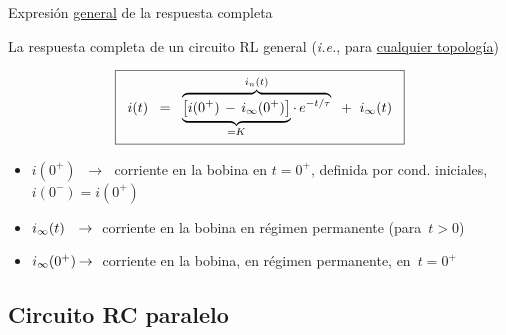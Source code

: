 \documentclass[aspectratio=169, usenames,svgnames,dvipsnames]{beamer}
\begin{document}

\begin{frame}{Expresión \underline{general} de la respuesta completa}

    La \alert{respuesta completa} de un \alert{circuito RL general} (\textit{i.e.}, para \underline{cualquier topología})
    
    \large
    \[
        \boxed{\;\; i(t) \;\;=\;\; \overbrace{\underbrace{\left[i(0^+) \,-\, i_\infty(0^+)\right]}_{\vphantom{\frac{a}{a}} =K} \cdot \, e^{-t/\tau}}^{\vphantom{\frac{A}{A}} i_n(t)} \;\;+\;\; i_\infty(t) \;\;}
    \]

    \vspace{2mm}
    \normalsize
    \begin{itemize}
        \item \(i(0^+) \;\;\rightarrow\;\) corriente en la bobina en \(t = 0^+\), definida por cond. iniciales, \(i(0^-) = i(0^+)\)

        \vspace{2mm}
        \item \(i_\infty(t) \hspace{2.5mm}\rightarrow\;\) corriente en la bobina en régimen permanente (para \(\, t > 0 \))

        \vspace{2mm}
        \item \(i_\infty(0^+) \hspace{-0.25mm}\rightarrow\;\) corriente en la bobina, en régimen permanente, en \(\, t = 0^+\)
    \end{itemize}
\end{frame}


\subsection{Circuito RC paralelo}
\end{document}
